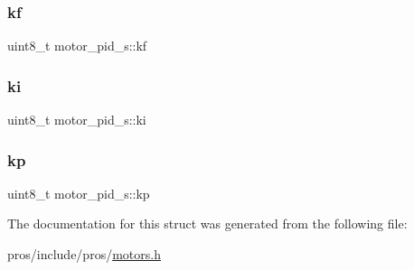 \mbox{\label{structmotor__pid__s_aad53ebe7d1c645811b3dc6cb825bd590}} 
\subsubsection{\texorpdfstring{kf}{kf}}
{\footnotesize\ttfamily uint8\+\_\+t motor\+\_\+pid\+\_\+s\+::kf}

\mbox{\label{structmotor__pid__s_ac894dd6c3683c2daa403b81e259a1cae}} 
\subsubsection{\texorpdfstring{ki}{ki}}
{\footnotesize\ttfamily uint8\+\_\+t motor\+\_\+pid\+\_\+s\+::ki}

\mbox{\label{structmotor__pid__s_a31c38ff6a4245e81c4db42579b90be31}} 
\subsubsection{\texorpdfstring{kp}{kp}}
{\footnotesize\ttfamily uint8\+\_\+t motor\+\_\+pid\+\_\+s\+::kp}



The documentation for this struct was generated from the following file\+:\begin{DoxyCompactItemize}
\item 
pros/include/pros/\hyperlink{motors_8h}{motors.\+h}\end{DoxyCompactItemize}
